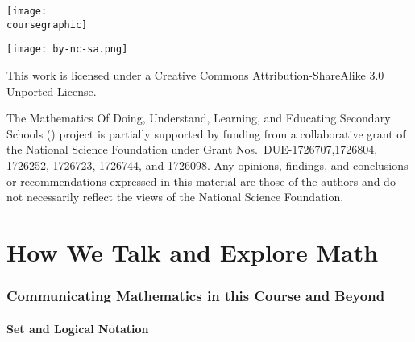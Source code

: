 \documentclass[11pt]{article}
\theoremstyle{definition}
\begin{document}
\maketitle
\ifthenelse{\equal{\coursegraphic}{}} %
	{}
	{\begin{center}\texttt{[image: \\coursegraphic]}\end{center}}
	
\vfill 
\begin{center} \texttt{[image: by-nc-sa.png]} \end{center}
\footnotesize{ This work is licensed under a Creative Commons Attribution-ShareAlike 3.0 Unported License. }

\footnotesize{
The Mathematics Of Doing, Understand, Learning, and Educating Secondary Schools (\MODULES) project is partially supported by funding from a collaborative grant of the National Science Foundation under Grant Nos.~DUE-1726707,1726804, 1726252, 1726723, 1726744, and 1726098.  Any opinions, findings, and conclusions or recommendations expressed in this material are those of the authors and do not necessarily reflect the views of the National Science Foundation.}
\newpage
\thispagestyle{plain}   
\listoftodos
\tableofcontents
\newpage {}
\newpage 
\part{How We Talk and Explore Math} 

\setcounter{section}{-1}

\newpage \section{Communicating Mathematics in this Course and Beyond}\label{section: communicating mathematics}

\subsection{Set and Logical Notation}
\end{document}
